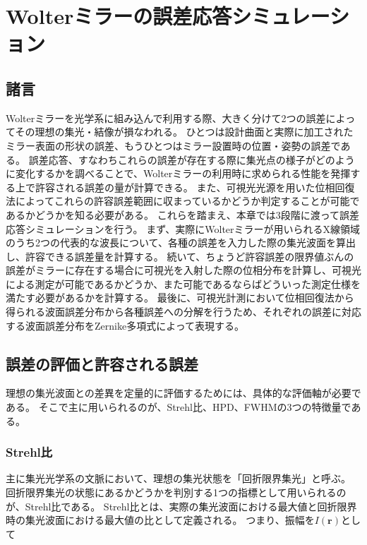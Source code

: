 \chapter{Wolterミラーの誤差応答シミュレーション}
\thispagestyle{empty}
\label{chap2}
\graphicspath{{chap2/figure/}}
\minitoc

\newpage


\section{諸言}
\label{chap2_introduction}

Wolterミラーを光学系に組み込んで利用する際、大きく分けて2つの誤差によってその理想の集光・結像が損なわれる。
ひとつは設計曲面と実際に加工されたミラー表面の形状の誤差、もうひとつはミラー設置時の位置・姿勢の誤差である。
誤差応答、すなわちこれらの誤差が存在する際に集光点の様子がどのように変化するかを調べることで、Wolterミラーの利用時に求められる性能を発揮する上で許容される誤差の量が計算できる。
また、可視光光源を用いた位相回復法によってこれらの許容誤差範囲に収まっているかどうか判定することが可能であるかどうかを知る必要がある。
これらを踏まえ、本章では3段階に渡って誤差応答シミュレーションを行う。
まず、実際にWolterミラーが用いられるX線領域のうち2つの代表的な波長について、各種の誤差を入力した際の集光波面を算出し、許容できる誤差量を計算する。
続いて、ちょうど許容誤差の限界値ぶんの誤差がミラーに存在する場合に可視光を入射した際の位相分布を計算し、可視光による測定が可能であるかどうか、また可能であるならばどういった測定仕様を満たす必要があるかを計算する。
最後に、可視光計測において位相回復法から得られる波面誤差分布から各種誤差への分解を行うため、それぞれの誤差に対応する波面誤差分布をZernike多項式によって表現する。

\clearpage
\newpage
\section{誤差の評価と許容される誤差}
\label{chap2_beam_evaluation_standard}

理想の集光波面との差異を定量的に評価するためには、具体的な評価軸が必要である。
そこで主に用いられるのが、Strehl比、HPD、FWHMの3つの特徴量である。

\subsection{Strehl比}
\label{chap2_strehl_ratio}
主に集光光学系の文脈において、理想の集光状態を「回折限界集光」と呼ぶ。
回折限界集光の状態にあるかどうかを判別する1つの指標として用いられるのが、Strehl比である。
Strehl比とは、実際の集光波面における最大値と回折限界時の集光波面における最大値の比として定義される。
つまり、振幅を$I(\mathbf{r})$として

